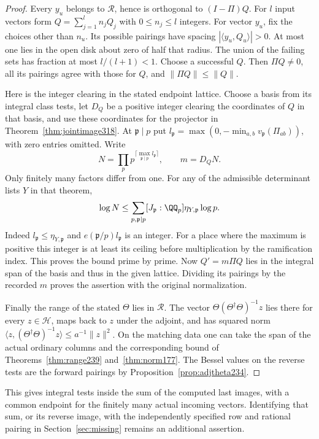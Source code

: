 \documentclass[a4paper,11pt]{article}
\theoremstyle{definition}
\theoremstyle{remark}
\numberwithin{equation}{section}
\begin{document}
\begin{proof}
Every \(y_u\) belongs to \(\mathcal R\), hence is orthogonal
to \((I-\Pi)Q\). For \(l\) input vectors form
\(Q=\sum_{j=1}^l n_j Q_j\) with \(0\le n_j\le l\) integers.
For vector \(y_u\), fix the choices other than \(n_u\).
Its possible pairings have spacing
\(|\langle y_u,Q_u\rangle|>0\). At most one lies in the
open disk about zero of half that radius. The union of
the failing sets has fraction at most \(l/(l+1)<1\).
Choose a successful \(Q\). Then \(\Pi Q\ne0\), all its
pairings agree with those for \(Q\), and \(\|\Pi Q\|\le\|Q\|\).

Here is the integer clearing in the stated endpoint lattice.
Choose a basis from its integral class tests, let \(D_Q\)
be a positive integer clearing the coordinates of \(Q\)
in that basis, and use these coordinates for the projector
in Theorem~\ref{thm:jointimage318}. At \(\mathfrak p\mid p\)
put \(l_{\mathfrak p}=\max(0,-\min_{a,b}v_{\mathfrak p}
(\Pi_{ab}))\), with zero entries omitted. Write
\[
   N=\prod_p p^{\lceil\max_{\mathfrak p\mid p}
                                      l_{\mathfrak p}\rceil},
              \qquad m=D_QN .
\]
Only finitely many factors differ from one. For any of
the admissible determinant lists \(Y\) in that theorem,
\[
 \log N\le\sum_{p,\mathfrak p\mid p}
         [J_{\mathfrak p}:\QQ_p]\eta_{Y,\mathfrak p}\log p .
\]
Indeed \(l_{\mathfrak p}\le\eta_{Y,\mathfrak p}\) and
\(e(\mathfrak p/p)l_{\mathfrak p}\) is an integer. For a
place where the maximum is positive this integer is at
least its ceiling before multiplication by the ramification
index. This proves the bound prime by prime.
Now \(Q'=m\Pi Q\) lies in the integral span of the basis
and thus in the given lattice. Dividing its pairings by
the recorded \(m\) proves the assertion with the original
normalization.

Finally the range of the stated \(\Theta\) lies in
\(\mathcal R\). The vector
\(\Theta(\Theta^\dagger\Theta)^{-1}z\) lies there for every
\(z\in\mathcal H\), maps back to \(z\) under the adjoint,
and has squared norm
\(\langle z,(\Theta^\dagger\Theta)^{-1}z\rangle
 \le a^{-1}\|z\|^2\). On the matching data one can take
the span of the actual ordinary columns and the corresponding
bound of Theorems~\ref{thm:range239} and~\ref{thm:norm177}.
The Bessel values on the reverse tests are the forward
pairings by Proposition~\ref{prop:adjtheta234}.
\end{proof}

This gives integral tests inside the sum of the computed
last images, with a common endpoint for the finitely many
actual incoming vectors. Identifying that sum, or its
reverse image, with the independently specified row and
rational pairing in Section~\ref{sec:missing} remains an
additional assertion.
\end{document}
